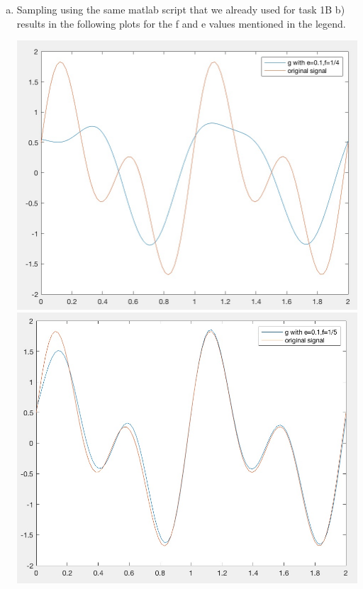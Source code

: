 \documentclass[12pt]{article}
\begin{document}
\begin{enumerate}[a)]
	\item Sampling using the same matlab script that we already used for task 1B b) results in the following plots for the f and e values mentioned in the legend.\\
        \begin{centering}
        \includegraphics[scale = 0.3]{figures/e01-f14}\\
        \includegraphics[scale = 0.3]{figures/e01-f15}\\

\end{centering}
\end{enumerate}
\end{document}
